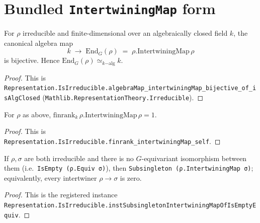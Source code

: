 \section{Bundled \texttt{IntertwiningMap} form}

\begin{theorem}
  \label{thm:schur-scalar}
  \mathlibok
  \leanok
  For $\rho$ irreducible and finite-dimensional over an algebraically closed
  field $k$, the canonical algebra map
  \[
     k \;\longrightarrow\; \mathrm{End}_G(\rho) \;=\; \rho.\mathrm{IntertwiningMap}\,\rho
  \]
  is bijective. Hence $\mathrm{End}_G(\rho) \simeq_{\!k\!\mathrm{-alg}} k$.
\end{theorem}

\begin{proof}
  \leanok
  This is
  \texttt{Representation.IsIrreducible.algebraMap\_intertwiningMap\_bijective\_of\_isAlgClosed}
  (\texttt{Mathlib.RepresentationTheory.Irreducible}).
\end{proof}

\begin{theorem}
  \label{thm:schur-finrank-self}
  \mathlibok
  \leanok
  For $\rho$ as above, $\mathrm{finrank}_k\, \rho.\mathrm{IntertwiningMap}\,\rho = 1$.
\end{theorem}

\begin{proof}
  \leanok
  This is
  \texttt{Representation.IsIrreducible.finrank\_intertwiningMap\_self}.
\end{proof}

\begin{theorem}
  \label{thm:schur-distinct}
  \mathlibok
  \leanok
  If $\rho, \sigma$ are both irreducible and there is no $G$-equivariant
  isomorphism between them (i.e.\ \texttt{IsEmpty (ρ.Equiv σ)}), then
  \texttt{Subsingleton (ρ.IntertwiningMap σ)}; equivalently, every
  intertwiner $\rho \to \sigma$ is zero.
\end{theorem}

\begin{proof}
  \leanok
  This is the registered instance
  \texttt{Representation.IsIrreducible.instSubsingletonIntertwiningMapOfIsEmptyEquiv}.
\end{proof}


